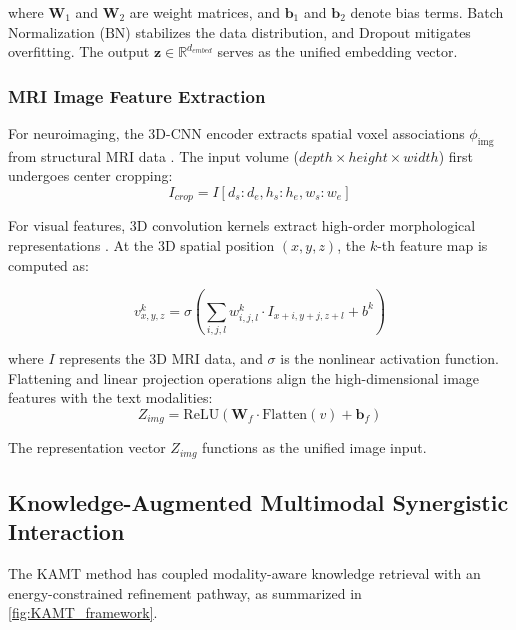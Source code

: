\documentclass[lettersize,journal]{IEEEtran}
\begin{document}
    where $\mathbf{W}_1$ and $\mathbf{W}_2$ are weight matrices, and $\mathbf{b}_1$ and $\mathbf{b}_2$ denote bias terms. Batch Normalization ($\text{BN}$) stabilizes the data distribution, and $\text{Dropout}$ mitigates overfitting. The output $\mathbf{z} \in \mathbb{R}^{d_{embed}}$ serves as the unified embedding vector.


\subsubsection{MRI Image Feature Extraction}
    
    For neuroimaging, the 3D-CNN encoder extracts spatial voxel associations $\phi_{\mathrm{img}}$ from structural MRI data \cite{wen2020convolutional}. The input volume ($depth \times height \times width$) first undergoes center cropping:
    \begin{equation}
        I_{crop} = I [d_{s}:d_{e}, h_{s}:h_{e}, w_{s}:w_{e}]
        \label{eq:center_crop}
    \end{equation}

    For visual features, 3D convolution kernels extract high-order morphological representations \cite{tran2015c3d}. At the 3D spatial position $(x, y, z)$, the $k$-th feature map is computed as:
    
    \begin{equation}
        v_{x,y,z}^{k} = \sigma \left( \sum_{i,j,l} w_{i,j,l}^{k} \cdot I_{x+i, y+j, z+l} + b^k \right)
        \label{eq:3dcnn}
    \end{equation}

    where $I$ represents the 3D MRI data, and $\sigma$ is the nonlinear activation function. Flattening and linear projection operations align the high-dimensional image features with the text modalities:
    \begin{equation}
        Z_{img} = \mathrm{ReLU}(\mathbf{W}_{f} \cdot \mathrm{Flatten}(v) + \mathbf{b}_f)
        \label{eq:mri_projection}
    \end{equation}

    The representation vector $Z_{img}$ functions as the unified image input. 

\subsection{Knowledge-Augmented Multimodal Synergistic Interaction}

    The KAMT method has coupled modality-aware knowledge retrieval with an energy-constrained refinement pathway, as summarized in \cref{fig:KAMT_framework}.
\end{document}
